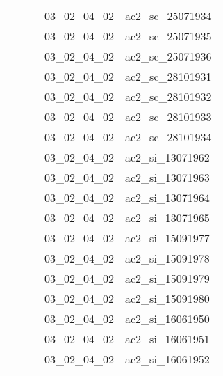 \documentclass[12pt,titlepage]{book}
\begin{document}
\begin{supertabular}{|p{7.5cm}|p{7.5cm}|p{7.5cm}|c|p{10cm}|}
                   &                    &                    & 03\_02\_04\_02 & ac2\_sc\_25071934\\
                   &                    &                    & 03\_02\_04\_02 & ac2\_sc\_25071935\\
                   &                    &                    & 03\_02\_04\_02 & ac2\_sc\_25071936\\
                   &                    &                    & 03\_02\_04\_02 & ac2\_sc\_28101931\\
                   &                    &                    & 03\_02\_04\_02 & ac2\_sc\_28101932\\
                   &                    &                    & 03\_02\_04\_02 & ac2\_sc\_28101933\\
                   &                    &                    & 03\_02\_04\_02 & ac2\_sc\_28101934\\
                   &                    &                    & 03\_02\_04\_02 & ac2\_si\_13071962\\
                   &                    &                    & 03\_02\_04\_02 & ac2\_si\_13071963\\
                   &                    &                    & 03\_02\_04\_02 & ac2\_si\_13071964\\
                   &                    &                    & 03\_02\_04\_02 & ac2\_si\_13071965\\
                   &                    &                    & 03\_02\_04\_02 & ac2\_si\_15091977\\
                   &                    &                    & 03\_02\_04\_02 & ac2\_si\_15091978\\
                   &                    &                    & 03\_02\_04\_02 & ac2\_si\_15091979\\
                   &                    &                    & 03\_02\_04\_02 & ac2\_si\_15091980\\
                   &                    &                    & 03\_02\_04\_02 & ac2\_si\_16061950\\
                   &                    &                    & 03\_02\_04\_02 & ac2\_si\_16061951\\
                   &                    &                    & 03\_02\_04\_02 & ac2\_si\_16061952\\

\end{supertabular}
\end{document}
